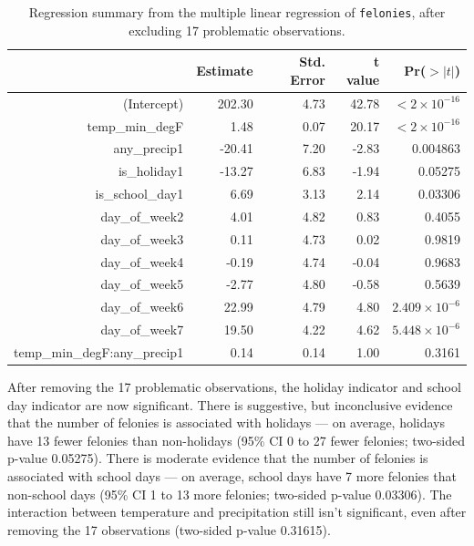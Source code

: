 \documentclass[11pt,notitlepage]{article}
\begin{document}
\begin{table}[ht]
\vspace*{-1mm}
\footnotesize
\centering
\begin{tabular}{rrrrr}
  \hline
 & Estimate & Std. Error & t value & Pr($>|t|$) \\ 
  \hline
(Intercept) & 202.30 & 4.73 & 42.78 & $<2 \times 10^{-16}$ \\ 
  temp\_min\_degF & 1.48 & 0.07 & 20.17 & $<2 \times 10^{-16}$ \\ 
  any\_precip1 & -20.41 & 7.20 & -2.83 & 0.004863 \\ 
  is\_holiday1 & -13.27 & 6.83 & -1.94 & 0.05275 \\ 
  is\_school\_day1 & 6.69 & 3.13 & 2.14 & 0.03306 \\ 
  day\_of\_week2 & 4.01 & 4.82 & 0.83 & 0.4055 \\ 
  day\_of\_week3 & 0.11 & 4.73 & 0.02 & 0.9819 \\ 
  day\_of\_week4 & -0.19 & 4.74 & -0.04 & 0.9683 \\ 
  day\_of\_week5 & -2.77 & 4.80 & -0.58 & 0.5639 \\ 
  day\_of\_week6 & 22.99 & 4.79 & 4.80 & $2.409 \times 10^{-6}$ \\ 
  day\_of\_week7 & 19.50 & 4.22 & 4.62 & $5.448 \times 10^{-6}$ \\ 
  temp\_min\_degF:any\_precip1 & 0.14 & 0.14 & 1.00 & 0.3161 \\ 
   \hline
\end{tabular}
\captionsetup{width=0.9\textwidth}
\vspace*{-2mm}
\caption{Regression summary from the multiple linear regression of \texttt{felonies}, after excluding 17 problematic observations.}
\label{tab:lm5}   
\vspace*{-3mm}
\end{table}





After removing the 17 problematic observations, the holiday indicator and school day indicator are now significant. There is suggestive, but inconclusive evidence that the number of felonies is associated with holidays --- on average, holidays have 13 fewer felonies than non-holidays (95\% CI 0 to 27 fewer felonies; two-sided p-value 0.05275). There is moderate evidence that the number of felonies is associated with school days --- on average, school days have 7 more felonies that non-school days (95\% CI 1 to 13 more felonies; two-sided p-value 0.03306). The interaction between temperature and precipitation still isn't significant, even after removing the 17 observations (two-sided p-value 0.31615).
\end{document}

